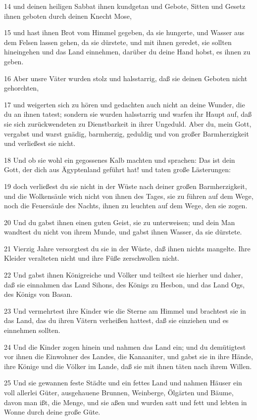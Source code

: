 \par 14 und deinen heiligen Sabbat ihnen kundgetan und Gebote, Sitten und Gesetz ihnen geboten durch deinen Knecht Mose,
\par 15 und hast ihnen Brot vom Himmel gegeben, da sie hungerte, und Wasser aus dem Felsen lassen gehen, da sie dürstete, und mit ihnen geredet, sie sollten hineingehen und das Land einnehmen, darüber du deine Hand hobst, es ihnen zu geben.
\par 16 Aber unsre Väter wurden stolz und halsstarrig, daß sie deinen Geboten nicht gehorchten,
\par 17 und weigerten sich zu hören und gedachten auch nicht an deine Wunder, die du an ihnen tatest; sondern sie wurden halsstarrig und warfen ihr Haupt auf, daß sie sich zurückwendeten zu Dienstbarkeit in ihrer Ungeduld. Aber du, mein Gott, vergabst und warst gnädig, barmherzig, geduldig und von großer Barmherzigkeit und verließest sie nicht.
\par 18 Und ob sie wohl ein gegossenes Kalb machten und sprachen: Das ist dein Gott, der dich aus Ägyptenland geführt hat! und taten große Lästerungen:
\par 19 doch verließest du sie nicht in der Wüste nach deiner großen Barmherzigkeit, und die Wolkensäule wich nicht von ihnen des Tages, sie zu führen auf dem Wege, noch die Feuersäule des Nachts, ihnen zu leuchten auf dem Wege, den sie zogen.
\par 20 Und du gabst ihnen einen guten Geist, sie zu unterweisen; und dein Man wandtest du nicht von ihrem Munde, und gabst ihnen Wasser, da sie dürstete.
\par 21 Vierzig Jahre versorgtest du sie in der Wüste, daß ihnen nichts mangelte. Ihre Kleider veralteten nicht und ihre Füße zerschwollen nicht.
\par 22 Und gabst ihnen Königreiche und Völker und teiltest sie hierher und daher, daß sie einnahmen das Land Sihons, des Königs zu Hesbon, und das Land Ogs, des Königs von Basan.
\par 23 Und vermehrtest ihre Kinder wie die Sterne am Himmel und brachtest sie in das Land, das du ihren Vätern verheißen hattest, daß sie einziehen und es einnehmen sollten.
\par 24 Und die Kinder zogen hinein und nahmen das Land ein; und du demütigtest vor ihnen die Einwohner des Landes, die Kanaaniter, und gabst sie in ihre Hände, ihre Könige und die Völker im Lande, daß sie mit ihnen täten nach ihrem Willen.
\par 25 Und sie gewannen feste Städte und ein fettes Land und nahmen Häuser ein voll allerlei Güter, ausgehauene Brunnen, Weinberge, Ölgärten und Bäume, davon man ißt, die Menge, und sie aßen und wurden satt und fett und lebten in Wonne durch deine große Güte.
